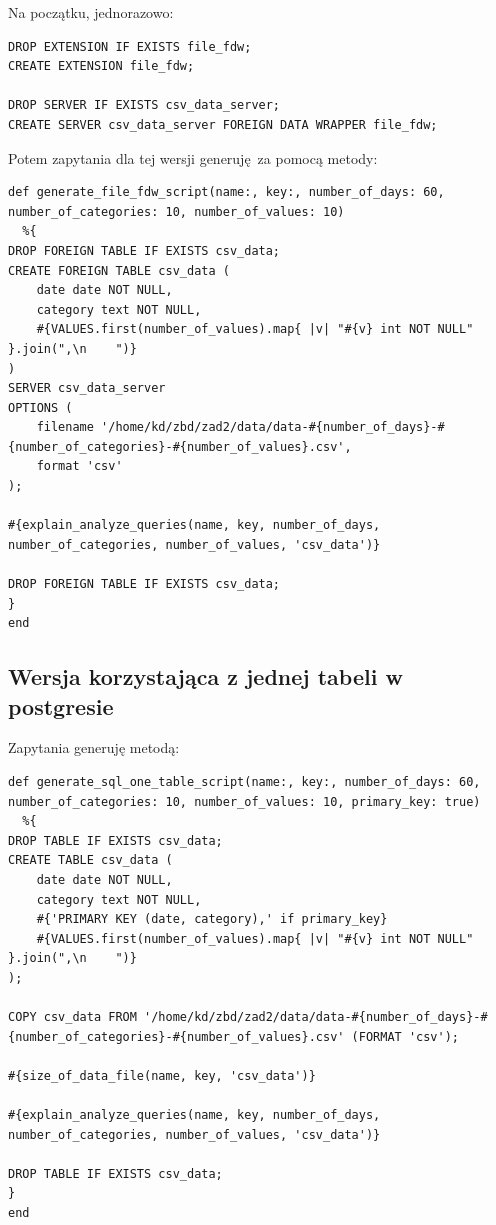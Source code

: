 \documentclass[a4paper,11pt]{article}
\begin{document}
Na początku, jednorazowo:
\begin{lstlisting}
DROP EXTENSION IF EXISTS file_fdw;
CREATE EXTENSION file_fdw;

DROP SERVER IF EXISTS csv_data_server;
CREATE SERVER csv_data_server FOREIGN DATA WRAPPER file_fdw;
\end{lstlisting}
Potem zapytania dla tej wersji generuję za pomocą metody:
\begin{lstlisting}
def generate_file_fdw_script(name:, key:, number_of_days: 60, number_of_categories: 10, number_of_values: 10)
  %{
DROP FOREIGN TABLE IF EXISTS csv_data;
CREATE FOREIGN TABLE csv_data (
    date date NOT NULL,
    category text NOT NULL,
    #{VALUES.first(number_of_values).map{ |v| "#{v} int NOT NULL" }.join(",\n    ")}
)
SERVER csv_data_server
OPTIONS (
    filename '/home/kd/zbd/zad2/data/data-#{number_of_days}-#{number_of_categories}-#{number_of_values}.csv',
    format 'csv'
);

#{explain_analyze_queries(name, key, number_of_days, number_of_categories, number_of_values, 'csv_data')}

DROP FOREIGN TABLE IF EXISTS csv_data;
}
end
\end{lstlisting}


\subsection{Wersja korzystająca z jednej tabeli w postgresie}

Zapytania generuję metodą:
\begin{lstlisting}
def generate_sql_one_table_script(name:, key:, number_of_days: 60, number_of_categories: 10, number_of_values: 10, primary_key: true)
  %{
DROP TABLE IF EXISTS csv_data;
CREATE TABLE csv_data (
    date date NOT NULL,
    category text NOT NULL,
    #{'PRIMARY KEY (date, category),' if primary_key}
    #{VALUES.first(number_of_values).map{ |v| "#{v} int NOT NULL" }.join(",\n    ")}
);

COPY csv_data FROM '/home/kd/zbd/zad2/data/data-#{number_of_days}-#{number_of_categories}-#{number_of_values}.csv' (FORMAT 'csv');

#{size_of_data_file(name, key, 'csv_data')}

#{explain_analyze_queries(name, key, number_of_days, number_of_categories, number_of_values, 'csv_data')}

DROP TABLE IF EXISTS csv_data;
}
end
\end{lstlisting}
\end{document}
